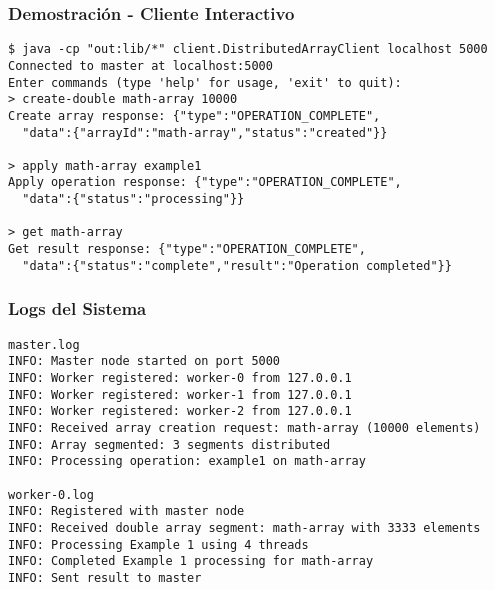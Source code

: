 \documentclass{beamer}
\begin{document}
\begin{frame}[fragile]
\frametitle{Demostración - Cliente Interactivo}
\begin{lstlisting}[style=terminal]
$ java -cp "out:lib/*" client.DistributedArrayClient localhost 5000
Connected to master at localhost:5000
Enter commands (type 'help' for usage, 'exit' to quit):
> create-double math-array 10000
Create array response: {"type":"OPERATION_COMPLETE",
  "data":{"arrayId":"math-array","status":"created"}}

> apply math-array example1
Apply operation response: {"type":"OPERATION_COMPLETE",
  "data":{"status":"processing"}}

> get math-array
Get result response: {"type":"OPERATION_COMPLETE",
  "data":{"status":"complete","result":"Operation completed"}}
\end{lstlisting}
\end{frame}

\begin{frame}[fragile]
\frametitle{Logs del Sistema}
\begin{lstlisting}[style=terminal, basicstyle=\tiny\ttfamily\color{terminalwhite}]
master.log
INFO: Master node started on port 5000
INFO: Worker registered: worker-0 from 127.0.0.1
INFO: Worker registered: worker-1 from 127.0.0.1
INFO: Worker registered: worker-2 from 127.0.0.1
INFO: Received array creation request: math-array (10000 elements)
INFO: Array segmented: 3 segments distributed
INFO: Processing operation: example1 on math-array

worker-0.log
INFO: Registered with master node
INFO: Received double array segment: math-array with 3333 elements
INFO: Processing Example 1 using 4 threads
INFO: Completed Example 1 processing for math-array
INFO: Sent result to master
\end{lstlisting}
\end{frame}
\end{document}
